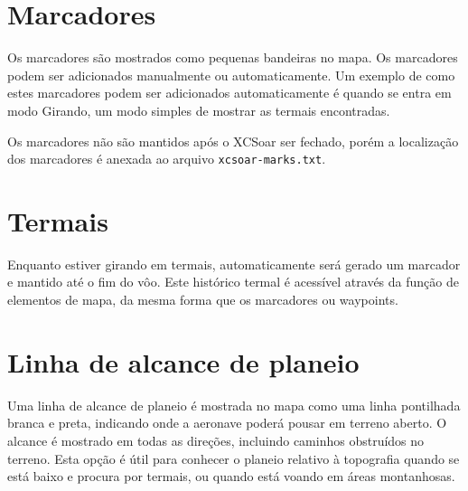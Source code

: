 \section{Marcadores}\label{sec:markers}

Os marcadores são mostrados como pequenas bandeiras no mapa.  Os marcadores podem ser adicionados manualmente ou automaticamente.  Um exemplo de como estes marcadores podem ser adicionados automaticamente é quando se entra em modo Girando, um modo simples de mostrar as termais encontradas.

Os marcadores não são mantidos após o XCSoar ser fechado, porém a localização dos marcadores é anexada ao arquivo
 \verb|xcsoar-marks.txt|.

\section{Termais}

Enquanto estiver girando em termais, automaticamente será gerado um marcador e mantido até o  fim do vôo.  Este histórico termal é acessível através da função de elementos de mapa, da mesma forma que os marcadores ou waypoints.


\section{Linha de alcance de planeio}\label{sec:reach}

Uma linha de alcance de planeio é mostrada no mapa como uma linha pontilhada branca e preta, indicando onde a aeronave poderá pousar em terreno aberto.  O alcance é mostrado em todas as direções, incluindo caminhos obstruídos no terreno.  Esta opção é útil para conhecer o planeio relativo à topografia quando se está baixo e procura por termais, ou quando está voando em áreas montanhosas.

